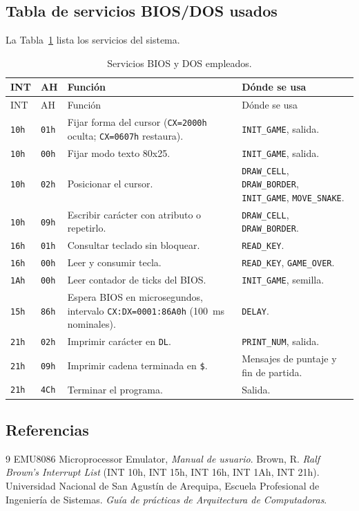 \documentclass[10pt]{article}
\begin{document}
\subsection{Tabla de servicios BIOS/DOS usados}
La Tabla~\ref{tab:servicios} lista los servicios del sistema.

\begin{longtable}{@{}p{1.4cm}p{1.8cm}p{5.2cm}p{4.6cm}@{}}
\caption{Servicios BIOS y DOS empleados.}\label{tab:servicios}\\
\toprule
INT & AH & Función & Dónde se usa \\
\midrule
\endfirsthead
\toprule
INT & AH & Función & Dónde se usa \\
\midrule
\endhead
\bottomrule
\endfoot
\texttt{10h} & \texttt{01h} & Fijar forma del cursor (\texttt{CX=2000h} oculta; \texttt{CX=0607h} restaura). & \texttt{INIT\_GAME}, salida. \\
\texttt{10h} & \texttt{00h} & Fijar modo texto 80x25. & \texttt{INIT\_GAME}, salida. \\
\texttt{10h} & \texttt{02h} & Posicionar el cursor. & \texttt{DRAW\_CELL}, \texttt{DRAW\_BORDER}, \texttt{INIT\_GAME}, \texttt{MOVE\_SNAKE}. \\
\texttt{10h} & \texttt{09h} & Escribir carácter con atributo o repetirlo. & \texttt{DRAW\_CELL}, \texttt{DRAW\_BORDER}. \\
\texttt{16h} & \texttt{01h} & Consultar teclado sin bloquear. & \texttt{READ\_KEY}. \\
\texttt{16h} & \texttt{00h} & Leer y consumir tecla. & \texttt{READ\_KEY}, \texttt{GAME\_OVER}. \\
\texttt{1Ah} & \texttt{00h} & Leer contador de ticks del BIOS. & \texttt{INIT\_GAME}, semilla. \\
\texttt{15h} & \texttt{86h} & Espera BIOS en microsegundos, intervalo \texttt{CX:DX=0001:86A0h} (100~ms nominales). & \texttt{DELAY}. \\
\texttt{21h} & \texttt{02h} & Imprimir carácter en \texttt{DL}. & \texttt{PRINT\_NUM}, salida. \\
\texttt{21h} & \texttt{09h} & Imprimir cadena terminada en \texttt{\$}. & Mensajes de puntaje y fin de partida. \\
\texttt{21h} & \texttt{4Ch} & Terminar el programa. & Salida. \\
\end{longtable}

\subsection{Referencias}
\begin{thebibliography}{9}
     EMU8086 Microprocessor Emulator, \emph{Manual de usuario}.
     Brown, R. \emph{Ralf Brown's Interrupt List} (INT 10h, INT 15h, INT 16h, INT 1Ah, INT 21h).
     Universidad Nacional de San Agustín de Arequipa, Escuela Profesional de Ingeniería de Sistemas. \emph{Guía de prácticas de Arquitectura de Computadoras}.
\end{thebibliography}
\end{document}
